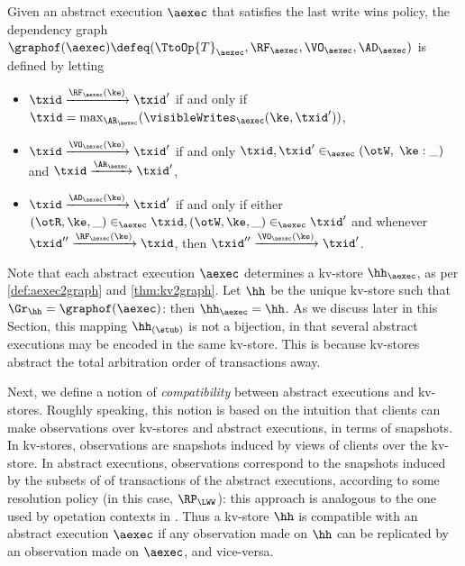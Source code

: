 \begin{definition}
\label{def:aexec2graph}
Given an abstract execution $\aexec$ that satisfies the last write wins policy,
the dependency graph $\graphof(\aexec) \defeq (\TtoOp{T}_{\aexec}, \RF_{\aexec}, 
\VO_{\aexec}, \AD_{\aexec})$ is defined by letting
\begin{itemize}
\item $\txid \xrightarrow{\RF_{\aexec}(\ke)} \txid'$ if and only if 
$\txid = \max_{\AR_{\aexec}}(\visibleWrites_{\aexec}(\ke, \txid'))$, 
\item $\txid \xrightarrow{\VO_{\aexec}(\ke)} \txid'$ if and only 
$\txid, \txid' \in_{\aexec} (\otW, \;\ke: \_)$ 
and $\txid \xrightarrow{\AR_{\aexec}} \txid'$,
\item $\txid \xrightarrow{\AD_{\aexec}(\ke)} \txid'$ if and only if either 
$(\otR, \ke, \_) \in_{\aexec} \txid, (\otW, \ke, \_) \in_{\aexec} \txid'$ and 
whenever $\txid'' \xrightarrow{\RF_{\aexec}(\ke)} \txid$, 
then $\txid'' \xrightarrow{\VO_{\aexec}(\ke)} \txid'$.
\end{itemize}
\end{definition}
Note that each abstract execution $\aexec$ determines a kv-store 
$\hh_{\aexec}$, as per \cref{def:aexec2graph} and \cref{thm:kv2graph}. 
Let $\hh$ be the unique kv-store such that $\Gr_{\hh} = \graphof(\aexec)$: then 
$\hh_{\aexec} = \hh$. As we discuss later in this Section, this mapping 
$\hh_{(\stub)}$ is not a bijection, in that several abstract executions may be 
encoded in the same kv-store. This is because kv-stores abstract the total 
arbitration order of transactions away.


Next, we define a notion of \emph{compatibility} between abstract executions and 
kv-stores. Roughly speaking, 
this notion is based on the intuition that clients can make observations over kv-stores and abstract 
executions, in terms of snapshots. In kv-stores, 
observations are snapshots induced by views of clients over the kv-store. 
In abstract executions, observations correspond to the snapshots induced by the subsets of
of transactions of the abstract executions, according to some resolution policy (in this 
case, $\RP_{\LWW}$): this approach is analogous to the one used by 
opetation contexts in \cite{repldatatypes}. Thus a kv-store $\hh$ is 
compatible with an abstract execution $\aexec$ if any observation 
made on $\hh$ can be replicated by an observation made on 
$\aexec$, and vice-versa. 


